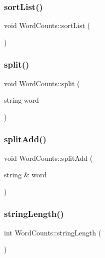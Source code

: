 \mbox{\label{class_word_counts_a0ad45e9548846c64517e76c2ccccdd05}} 
\subsubsection{\texorpdfstring{sort\+List()}{sortList()}}
{\footnotesize\ttfamily void Word\+Counts\+::sort\+List (\begin{DoxyParamCaption}{ }\end{DoxyParamCaption})}

\mbox{\label{class_word_counts_a403b84161c89026a98fe93f4965abc10}} 
\subsubsection{\texorpdfstring{split()}{split()}}
{\footnotesize\ttfamily void Word\+Counts\+::split (\begin{DoxyParamCaption}\item[{string}]{word }\end{DoxyParamCaption})}

\mbox{\label{class_word_counts_a16a319c8e6d77cf3c56d5e63fc0b88b3}} 
\subsubsection{\texorpdfstring{split\+Add()}{splitAdd()}}
{\footnotesize\ttfamily void Word\+Counts\+::split\+Add (\begin{DoxyParamCaption}\item[{string \&}]{word }\end{DoxyParamCaption})}

\mbox{\label{class_word_counts_aca07106cfd817404552854bbbaccd349}} 
\subsubsection{\texorpdfstring{string\+Length()}{stringLength()}}
{\footnotesize\ttfamily int Word\+Counts\+::string\+Length (\begin{DoxyParamCaption}{ }\end{DoxyParamCaption})}

